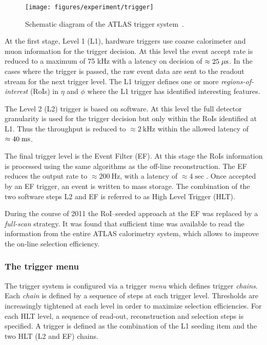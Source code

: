 \begin{figure}[ht]
\begin{center}
\texttt{[image: figures/experiment/trigger]}
\caption[ATLAS trigger system]{
  Schematic diagram of the ATLAS trigger system~\cite{trigger}. }
\label{fig:trigger}
\end{center}
\end{figure}

At the first stage, Level 1 (L1), hardware triggers use coarse
calorimeter and muon information for the trigger decision. At this
level the event accept rate is reduced to a maximum of 75 kHz with a
latency on decision of $\approx{}25\; \mu\mathrm{s}{}$. In the cases where the
trigger is passed, the raw event data are sent to the readout stream
for the next trigger level. The L1 trigger defines one or more
\emph{regions-of-interest} (RoIs) in $\eta{}$ and $\phi{}$ where the
L1 trigger has identified interesting features. 

The Level 2 (L2) trigger is based on software. At this level the full detector
granularity is used for the trigger decision but only within the RoIs
identified at L1. Thus the throughput is reduced to
$\approx{}2~\mathrm{kHz}$ within the allowed latency of $\approx{}40\; \mathrm{ms}{}$.

The final trigger level is the Event Filter (EF). At this stage the RoIs
information is processed using the same algorithms as the off-line
reconstruction. The EF reduces the output rate to $\approx{}200~\mathrm{Hz}$, 
with a latency of $\approx{}4\sec{}$. Once accepted by an EF trigger, an
event is written to mass storage.
The combination of the two software steps L2 and EF is referred to 
as High Level Trigger (HLT).

During the course of 2011 the RoI--seeded approach at the EF was replaced by a
{\it full-scan} strategy. It was found that sufficient time was available
to read the information from the entire ATLAS calorimetry system, 
which allows to improve the on-line selection efficiency.

\subsubsection{The trigger menu}

The trigger system is configured via a trigger \textit{menu} which
defines trigger \textit{chains}.
Each \textit{chain} is defined by a sequence of steps at each trigger level.
Thresholds are increasingly tightened at each level in order to
maximize selection efficiencies. 
For each HLT level, a sequence of read-out, reconstruction and
selection steps is specified. 
A trigger is defined as the combination of the L1 seeding item and the
two HLT (L2 and EF) chains. 

